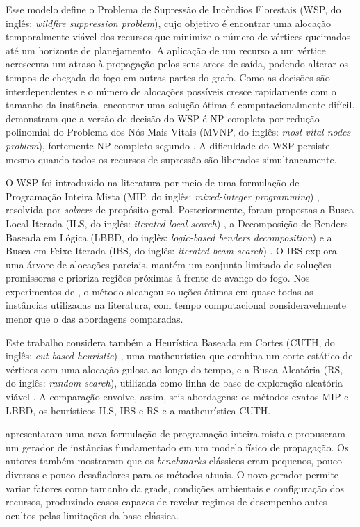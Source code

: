 Esse modelo define o Problema de Supressão de Incêndios Florestais
(WSP, do inglês: \textit{wildfire suppression problem}), cujo objetivo
é encontrar uma alocação temporalmente viável dos recursos que minimize o
número de vértices queimados até um horizonte de planejamento. A aplicação de
um recurso a um vértice acrescenta um atraso à propagação pelos seus arcos de
saída, podendo alterar os tempos de chegada do fogo em outras partes do grafo.
Como as decisões são interdependentes e o número de alocações possíveis cresce
rapidamente com o tamanho da instância, encontrar uma solução ótima é
computacionalmente difícil.  demonstram que a versão de decisão do WSP
é NP-completa por redução polinomial do Problema dos Nós Mais Vitais
(MVNP, do inglês: \textit{most vital nodes problem}), fortemente
NP-completo segundo . A dificuldade
do WSP persiste mesmo quando todos os recursos de supressão são liberados
simultaneamente.

O WSP foi introduzido na literatura por meio de uma formulação de
Programação Inteira Mista (MIP, do inglês: \textit{mixed-integer programming})
\cite{Alvelos2018}, resolvida por \textit{solvers} de propósito geral.
Posteriormente, foram propostas a Busca Local Iterada (ILS, do inglês:
\textit{iterated local search}) \cite{MendesAlvelos2023}, a Decomposição de
Benders Baseada em Lógica (LBBD, do inglês: \textit{logic-based benders
decomposition}) \cite{HarrisForbesTaimre2023} e a Busca em Feixe Iterada
(IBS, do inglês: \textit{iterated beam search}) \cite{DelazeriRitt2024}.
O IBS explora uma árvore de alocações parciais, mantém um conjunto limitado
de soluções promissoras e prioriza regiões próximas à frente de avanço do
fogo. Nos experimentos de , o método alcançou soluções
ótimas em quase todas as instâncias utilizadas na literatura, com tempo
computacional consideravelmente menor que o das abordagens comparadas.

Este trabalho considera também a Heurística Baseada em Cortes (CUTH,
do inglês: \textit{cut-based heuristic}) \cite{Delazeri2025}, uma
matheurística que combina um corte estático de vértices com uma alocação
gulosa ao longo do tempo, e a Busca Aleatória (RS, do inglês:
\textit{random search}), utilizada como linha de base de exploração
aleatória viável \cite{DelazeriRitt2026}. A comparação envolve, assim,
seis abordagens: os métodos exatos MIP e LBBD, os heurísticos ILS, IBS e RS
e a matheurística CUTH.

 apresentaram uma nova formulação de programação
inteira mista e propuseram um gerador de instâncias fundamentado em um modelo
físico de propagação. Os autores também mostraram que os \textit{benchmarks}
clássicos eram pequenos, pouco diversos e pouco desafiadores para os métodos
atuais. O novo gerador permite variar fatores como tamanho da grade, condições
ambientais e configuração dos recursos, produzindo casos capazes de revelar regimes de
desempenho antes ocultos pelas limitações da base clássica.

